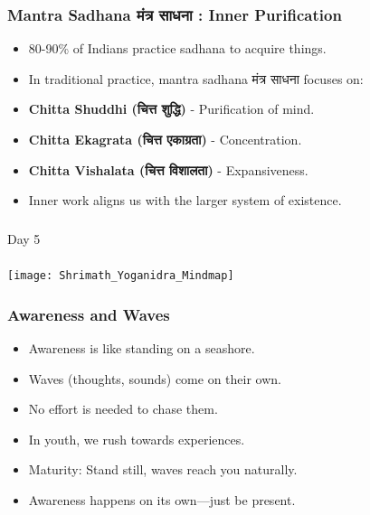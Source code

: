 \begin{frame}[fragile]\frametitle{Mantra Sadhana मंत्र साधना : Inner Purification}
      \begin{itemize}
        \item 80-90\% of Indians practice sadhana to acquire things.
        \item In traditional practice, mantra sadhana मंत्र साधना  focuses on:
        \item \textbf{Chitta Shuddhi (चित्त शुद्धि)} - Purification of mind.
        \item \textbf{Chitta Ekagrata (चित्त एकाग्रता)} - Concentration.
        \item \textbf{Chitta Vishalata (चित्त विशालता)} - Expansiveness.
        \item Inner work aligns us with the larger system of existence.
      \end{itemize}
\end{frame}



\begin{frame}[fragile]\frametitle{}
\begin{center}
{\Large Day 5}
\end{center}
\end{frame}


\begin{frame}[fragile]\frametitle{}
	\begin{center}
	\texttt{[image: Shrimath\_Yoganidra\_Mindmap]}
	\end{center}	
\end{frame}

\begin{frame}[fragile]\frametitle{Awareness and Waves}
      \begin{itemize}
        \item Awareness is like standing on a seashore.
        \item Waves (thoughts, sounds) come on their own.
        \item No effort is needed to chase them.
        \item In youth, we rush towards experiences.
        \item Maturity: Stand still, waves reach you naturally.
        \item Awareness happens on its own—just be present.
      \end{itemize}
\end{frame}

